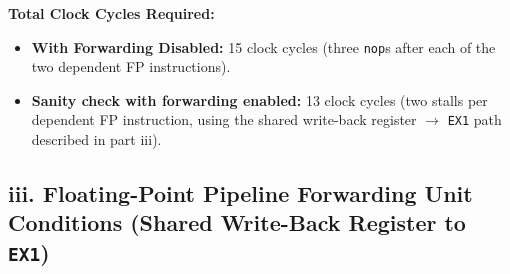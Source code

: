 \documentclass[11pt, a4paper]{article}
\begin{document}
\textbf{Total Clock Cycles Required:}
\begin{itemize}[noitemsep, topsep=2pt]
    \item \textbf{With Forwarding Disabled:} 15 clock cycles (three \texttt{nop}s after each of the two dependent FP instructions).
    \item \textbf{Sanity check with forwarding enabled:} 13 clock cycles (two stalls per dependent FP instruction, using the shared write-back register $\rightarrow$ \texttt{EX1} path described in part iii).
\end{itemize}

\vspace{8pt}
\subsection*{iii. Floating-Point Pipeline Forwarding Unit Conditions (Shared Write-Back Register to \texttt{EX1})}
\end{document}
